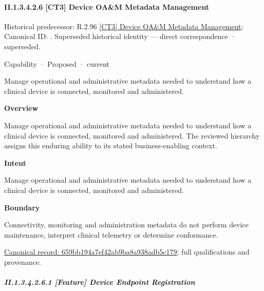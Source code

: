 \paragraph*{II.1.3.4.2.6 [CT3] Device OA\&M Metadata Management}
\label{navigation:II.1.3.4.2.6}

{\small Historical predecessor: R.2.96 \hyperref[element:a398c72bef094dee96c96d97994449fb]{[CT3] Device OA\&M Metadata Management}; Canonical ID: \texttt{}. Superseded historical identity — direct correspondence · superseded.}\par
\label{element:659bb194a7ef42ab9ba8a938adb5c179}
{\small Capability · Proposed · current}\par

Manage operational and administrative metadata needed to understand how a clinical device is connected, monitored and administered.



\textbf{Overview}



Manage operational and administrative metadata needed to understand how a clinical device is connected, monitored and administered. The reviewed hierarchy assigns this enduring ability to its stated business-enabling context.



\textbf{Intent}



Manage operational and administrative metadata needed to understand how a clinical device is connected, monitored and administered.



\textbf{Boundary}



Connectivity, monitoring and administration metadata do not perform device maintenance, interpret clinical telemetry or determine conformance.


{\footnotesize \href{../../../../../../../continuum/strategy/capability/659bb194a7ef42ab9ba8a938adb5c179.md}{Canonical record: 659bb194a7ef42ab9ba8a938adb5c179}; full qualifications and provenance.}\par
\subparagraph*{II.1.3.4.2.6.1 [Feature] Device Endpoint Registration}
\label{navigation:II.1.3.4.2.6.1}

